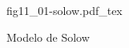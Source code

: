 \begin{figure}[h]
\centering
\def\svgwidth{0.5\textwidth}
{fig11_01-solow.pdf_tex}
\caption{Modelo de Solow}
\label{fig11_01-solow}
\end{figure}
